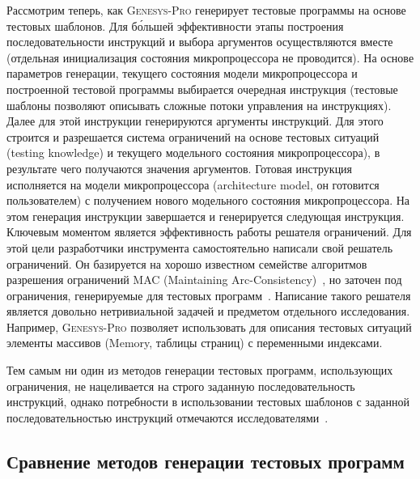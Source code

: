 Рассмотрим теперь, как \textsc{Genesys-Pro} генерирует тестовые
программы на основе тестовых шаблонов. Для б\'{о}льшей эффективности
этапы построения последовательности инструкций и выбора аргументов
осуществляются вместе (отдельная инициализация состояния
микропроцессора не проводится). На основе параметров генерации,
текущего состояния модели микропроцессора и построенной тестовой
программы выбирается очередная инструкция (тестовые шаблоны
позволяют описывать сложные потоки управления на инструкциях). Далее
для этой инструкции генерируются аргументы инструкций. Для этого
строится и разрешается система ограничений на основе тестовых
ситуаций (testing knowledge) и текущего модельного состояния
микропроцессора), в результате чего получаются значения аргументов.
Готовая инструкция исполняется на модели микропроцессора
(architecture model, он готовится пользователем) с получением нового
модельного состояния микропроцессора. На этом генерация инструкции
завершается и генерируется следующая инструкция. Ключевым моментом
является эффективность работы решателя ограничений. Для этой цели
разработчики инструмента самостоятельно написали свой решатель
ограничений. Он базируется на хорошо известном семействе алгоритмов
разрешения ограничений MAC (Maintaining Arc-Consistency)~\cite{CSP},
но заточен под ограничения, генерируемые для тестовых
программ~\cite{GenesysSolver}. Написание такого решателя является
довольно нетривиальной задачей и предметом отдельного исследования.
Например, \textsc{Genesys-Pro} позволяет использовать для описания
тестовых ситуаций элементы массивов (Memory, таблицы страниц) с
переменными индексами.

Тем самым ни один из методов генерации тестовых программ,
использующих ограничения, не нацеливается на строго заданную
последовательность инструкций, однако потребности в использовании
тестовых шаблонов с заданной последовательностью инструкций
отмечаются исследователями~\cite{kamkin}.


\subsection{Сравнение методов генерации тестовых программ}

